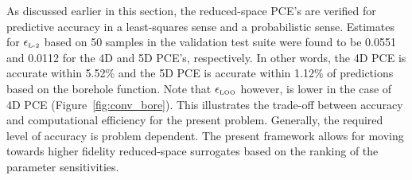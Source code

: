 As discussed earlier in this section, the reduced-space PCE's are verified for
predictive accuracy in a least-squares sense and a probabilistic sense.
Estimates for $\epsilon_{\mbox{\tiny{L-2}}}$ based on 50 samples in the
validation test suite were
found to be 0.0551 and 0.0112 for the 4D and 5D PCE's, respectively. In other
words, the 4D PCE is accurate within 5.52$\%$ and the 5D PCE is accurate within
1.12$\%$ of predictions based on the borehole function. Note that $\epsilon_\text{\tiny{LOO}}$
however, is lower in the case of 4D PCE (Figure~\ref{fig:conv_bore}).
This illustrates the
trade-off between accuracy and computational efficiency for the present 
problem. Generally, the required level of accuracy is problem dependent. 
The present framework allows for moving towards higher fidelity 
reduced-space surrogates based on the ranking of the parameter sensitivities. 
 


